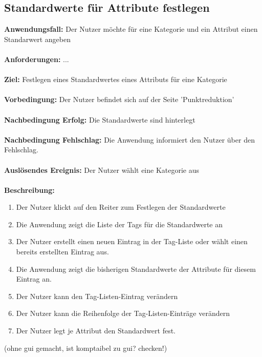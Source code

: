 \documentclass[parskip=full]{scrartcl} %
\begin{document}
\subsection*{Standardwerte für Attribute festlegen}
\textbf{Anwendungsfall:} Der Nutzer möchte für eine Kategorie und ein Attribut einen Standarwert angeben\\\\
\textbf{Anforderungen:} ...\\\\
\textbf{Ziel:} Festlegen eines Standardwertes eines Attributs für eine Kategorie \\\\
\textbf{Vorbedingung:} Der Nutzer befindet sich auf der Seite 'Punktreduktion' \\\\
\textbf{Nachbedingung Erfolg:} Die Standardwerte sind hinterlegt \\\\
\textbf{Nachbedingung Fehlschlag:} Die Anwendung informiert den Nutzer über den Fehlschlag. \\\\
\textbf{Auslösendes Ereignis:} Der Nutzer wählt eine Kategorie aus \\\\
\textbf{Beschreibung:}
\begin{enumerate}
    \item Der Nutzer klickt auf den Reiter zum Festlegen der Standardwerte
    \item Die Anwendung zeigt die Liste der Tags für die Standardwerte an
    \item Der Nutzer erstellt einen neuen Eintrag in der Tag-Liste oder wählt einen bereits erstellten Eintrag aus.
    \item Die Anwendung zeigt die bisherigen Standardwerte der Attribute für diesem Eintrag an.
    \item Der Nutzer kann den Tag-Listen-Eintrag verändern
    \item Der Nutzer kann die Reihenfolge der Tag-Listen-Einträge verändern
    \item Der Nutzer legt je Attribut den Standardwert fest.
\end{enumerate}
\newpage




(ohne gui gemacht, ist komptaibel zu gui? checken!)
\end{document}
